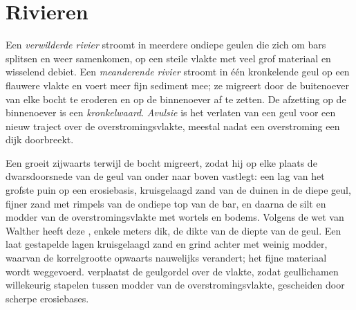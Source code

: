 \section{Rivieren}\label{sec:b3:facies-models:rivers}

\begin{definition}\label{def:b3:facies-models:rivers}
Een \emph{verwilderde rivier} stroomt in meerdere ondiepe
geulen die zich om bars splitsen en weer samenkomen, op een steile vlakte met veel
grof materiaal en wisselend debiet. Een \emph{meanderende rivier}
stroomt in één kronkelende geul op een flauwere vlakte en voert meer
fijn sediment mee; ze migreert door de buitenoever van elke bocht te eroderen en
op de binnenoever af te zetten. De afzetting op de binnenoever is een \emph{kronkelwaard}.
\emph{Avulsie} is het verlaten van een geul voor een nieuw
traject over de overstromingsvlakte, meestal nadat een overstroming
een dijk doorbreekt.
\end{definition}

Een  groeit zijwaarts terwijl de bocht migreert, zodat hij op elke plaats
de dwarsdoorsnede van de geul van onder naar boven vastlegt: een lag van het
grofste puin op een erosiebasis, kruisgelaagd zand van de duinen in de diepe
geul, fijner zand met rimpels van de ondiepe top van de bar, en daarna de
silt en modder van de overstromingsvlakte met wortels en bodems. Volgens de wet van Walther heeft deze
, enkele meters dik, de dikte van de
diepte van de geul. Een  laat gestapelde lagen kruisgelaagd zand
en grind achter met weinig modder, waarvan de korrelgrootte opwaarts nauwelijks verandert; het fijne
materiaal wordt weggevoerd.  verplaatst de geulgordel over de vlakte, zodat
geullichamen willekeurig stapelen tussen modder van de overstromingsvlakte, gescheiden door scherpe
erosiebases.

